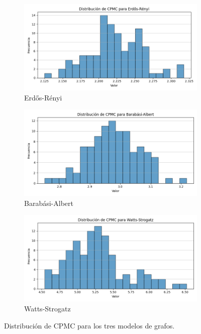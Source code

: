 \begin{figure}[ht!]
\centering
\begin{subfigure}{.32\textwidth}
  \centering
  \includegraphics[width=\linewidth]{images/cpmc_er.png}
  \caption{Erdős-Rényi}
\end{subfigure}%
\begin{subfigure}{.32\textwidth}
  \centering
  \includegraphics[width=\linewidth]{images/cpmc_ba.png}
  \caption{Barabási-Albert}
\end{subfigure}
\begin{subfigure}{.32\textwidth}
  \centering
  \includegraphics[width=\linewidth]{images/cpmc_ws.png}
  \caption{Watts-Strogatz}
\end{subfigure}
\caption{Distribución de CPMC para los tres modelos de grafos.}
\end{figure}

